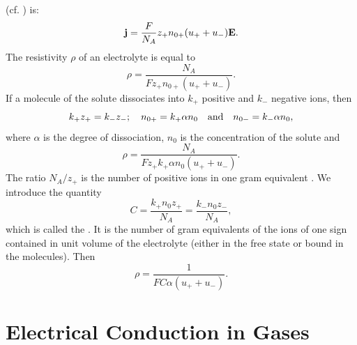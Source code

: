 \subsection{}\label{22.3.3}  (cf. ) is:
\begin{equation*}%
\vb{j} = \frac{F}{N_{A}}z_{+}n_{0+} (u_{+} + u_{-})\vb{E}.
\end{equation*}
The resistivity $\rho$ of an electrolyte  is equal to
\begin{equation*}%
\rho = \frac{N_{A}}{Fz_{+}n_{0+} (u_{+} + u_{-})}.
\end{equation*}
If a molecule of the solute dissociates into $k_{+}$ positive and $k_{-}$ negative ions, then
\begin{equation*}%
k_{+}z_{+} = k_{-}z_{-}; \quad n_{0+} = k_{+}\alpha n_{0} \qand n_{0-} = k_{-}\alpha n_{0},
\end{equation*}
where $\alpha$ is the degree of dissociation, $n_{0}$ is the concentration of the solute  and
\begin{equation*}%
\rho = \frac{N_{A}}{Fz_{+}k_{+}\alpha n_{0} (u_{+} + u_{-})}.
\end{equation*}
The ratio $N_{A}/z_{+}$ is the number of positive ions in one gram equivalent . We introduce the quantity
\begin{equation*}%
C = \frac{k_{+}n_{0}z_{+}}{N_{A}} = \frac{k_{-}n_{0}z_{-}}{N_{A}},
\end{equation*}
which is called the . It is the number of gram equivalents of the ions of one sign contained in unit volume of the electrolyte (either in the free state or bound in the molecules). Then
\begin{equation*}%
\rho = \frac{1}{F C \alpha(u_{+} + u_{-})}.
\end{equation*}


\section{Electrical Conduction in Gases}
\label{sec-22.4}


